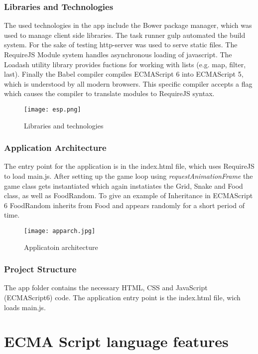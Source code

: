 \documentclass{bioinfo}
\begin{document}
\subsubsection{Libraries and Technologies}
The used technologies in the app include the Bower package manager, which was used to manage client side libraries. The task runner gulp automated the build system.
For the sake of testing http-server was used to serve static files. The RequireJS Module system handles asynchronous loading of javascript. The Loadash utility library
provides fuctions for working with lists (e.g. map, filter, last). Finally the Babel compiler compiles ECMAScript 6 into ECMAScript 5, which is understood by all modern browsers.
This specific compiler accepts a flag which causes the compiler to translate modules to RequireJS syntax.

\begin{figure}[!tpb]%
\centerline{\texttt{[image: esp.png]}}
\caption{Libraries and technologies}\label{fig:01}
\end{figure}


\subsubsection{Application Architecture}
The entry point for the application is in the index.html file, which uses RequireJS to load main.js. After setting up the game 
loop using \textit{requestAnimationFrame} the game class gets instantiated which again instatiates the Grid, Snake and Food class,
as well as FoodRandom. To give an example of Inheritance in ECMAScript 6 FoodRandom inherits from Food and appears randomly for
a short period of time.
\begin{figure}[!tpb]%
\centerline{\texttt{[image: apparch.jpg]}}
\caption{Applicatoin architecture}\label{fig:02}
\end{figure}
\subsubsection{Project Structure} 
The app folder contains the necessary HTML, CSS and JavaScript (ECMAScript6) code. The application entry point is the index.html file, wich loads main.js.

\section{ECMA Script language features}
\end{document}
